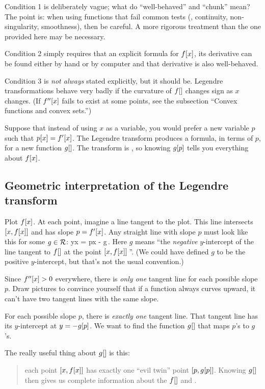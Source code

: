 Condition 1 is deliberately vague; what do ``well-behaved'' and ``chunk'' mean? The point is: when using functions that fail common tests (\eg, continuity, non-singularity, smoothness), then be careful. A more rigorous treatment than the one provided here may be necessary.

Condition 2 simply requires that an explicit formula for $f\!\left[{x}\right]$, its derivative can be found either by hand or by computer and that derivative is also well-behaved.

Condition 3 is \emph{not always} stated explicitly, but it should be. Legendre transformations behave very badly if the curvature of $f\!\left[{}\right]$ changes sign as $x$ changes. (If $f''\!\left[{x}\right]$ fails to exist at some points, see the subsection ``Convex functions and convex sets.'')

Suppose that instead of using $x$ as a variable, you would prefer a new variable $p$ such that $p\!\left[{x}\right] = f'\!\left[{x}\right]$. The Legendre transform produces a formula, in terms of $p$, for a new function $g\!\left[{}\right]$. The transform is , so knowing $g\!\left[{p}\right]$ tells you everything about $f\!\left[{x}\right]$.


\subsection{Geometric interpretation of the Legendre transform}
Plot $f\!\left[{x}\right]$. At each point, imagine a line tangent to the plot. This line intersects $\left[{x,f\!\left[{x}\right]}\right]$ and has slope $p = f'\!\left[{x}\right]$. Any straight line with slope $p$ must look like this for some $g\in\mathcal{R}$:
\beq
y\vat x = px - g\,.
\eeq
Here $g$ means ``the \emph{negative} $y$-intercept of the line tangent to $f\!\left[{}\right]$ at the point $\left[{x,f\!\left[{x}\right]}\right]$\,''. (We could have defined $g$ to be the positive $y$-intercept, but that's not the usual convention.)

Since $f''\!\left[{x}\right] > 0$ everywhere, there is \emph{only one} tangent line for each possible slope $p$. Draw pictures to convince yourself that if a function always curves upward, it can't have two tangent lines with the same slope.

For each possible slope $p$, there is \emph{exactly one} tangent line. That tangent line has its $y$-intercept at $y = -g\!\left[{p}\right]$. We want to find the function $g\!\left[{}\right]$ that maps $p$'s to $g$'s.

The really useful thing about $g\!\left[{}\right]$ is this: 
\begin{quote}
each point $\left[{x,f\!\left[{x}\right]}\right]$ has exactly one ``evil twin'' point $\left[{p,g\!\left[{p}\right]}\right]$. Knowing $g\!\left[{}\right]$ then gives us complete information about the $f\!\left[{}\right]$ and \vis.
\end{quote}


